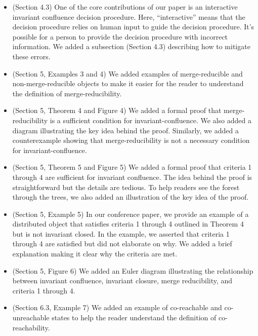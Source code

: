 \documentclass[12pt]{article}
\begin{document}
\begin{itemize}
  \item (Section 4.3)
    One of the core contributions of our paper is an interactive invariant
    confluence decision procedure. Here, ``interactive'' means that the
    decision procedure relies on human input to guide the decision procedure.
    It's possible for a person to provide the decision procedure with incorrect
    information. We added a subsection (Section 4.3) describing how to mitigate
    these errors.

  \item (Section 5, Examples 3 and 4)
    We added examples of merge-reducible and non-merge-reducible objects to
    make it easier for the reader to understand the definition of
    merge-reducibility.

  \item (Section 5, Theorem 4 and Figure 4)
    We added a formal proof that merge-reducibility is a sufficient condition
    for invariant-confluence. We also added a diagram illustrating the key idea
    behind the proof. Similarly, we added a counterexample showing that
    merge-reducibility is not a necessary condition for invariant-confluence.

  \item (Section 5, Theorem 5 and Figure 5)
    We added a formal proof that criteria 1 through 4 are sufficient for
    invariant confluence. The idea behind the proof is straightforward but the
    details are tedious. To help readers see the forest through the trees, we
    also added an illustration of the key idea of the proof.

  \item (Section 5, Example 5)
    In our conference paper, we provide an example of a distributed object that
    satisfies criteria 1 through 4 outlined in Theorem 4 but is not invariant
    closed. In the example, we asserted that criteria 1 through 4 are satisfied
    but did not elaborate on why. We added a brief explanation making it clear
    why the criteria are met.

  \item (Section 5, Figure 6)
    We added an Euler diagram illustrating the relationship between invariant
    confluence, invariant closure, merge reducibility, and criteria 1 through
    4.

  \item (Section 6.3, Example 7)
    We added an example of co-reachable and co-unreachable states to help the
    reader understand the definition of co-reachability.


\end{itemize}
\end{document}

